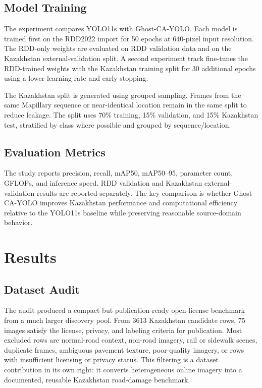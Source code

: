 \documentclass[applsci,article,submit,moreauthors]{Definitions/mdpi}
\begin{document}
\subsection{Model Training}

The experiment compares YOLO11s with Ghost-CA-YOLO. Each model is trained first on the RDD2022 import for 50 epochs at 640-pixel input resolution. The RDD-only weights are evaluated on RDD validation data and on the Kazakhstan external-validation split. A second experiment track fine-tunes the RDD-trained weights with the Kazakhstan training split for 30 additional epochs using a lower learning rate and early stopping.

The Kazakhstan split is generated using grouped sampling. Frames from the same Mapillary sequence or near-identical location remain in the same split to reduce leakage. The split uses 70\% training, 15\% validation, and 15\% Kazakhstan test, stratified by class where possible and grouped by sequence/location.

\subsection{Evaluation Metrics}

The study reports precision, recall, mAP50, mAP50--95, parameter count, GFLOPs, and inference speed. RDD validation and Kazakhstan external-validation results are reported separately. The key comparison is whether Ghost-CA-YOLO improves Kazakhstan performance and computational efficiency relative to the YOLO11s baseline while preserving reasonable source-domain behavior.

\section{Results}

\subsection{Dataset Audit}

The audit produced a compact but publication-ready open-license benchmark from a much larger discovery pool. From 3613 Kazakhstan candidate rows, 75 images satisfy the license, privacy, and labeling criteria for publication. Most excluded rows are normal-road context, non-road imagery, rail or sidewalk scenes, duplicate frames, ambiguous pavement texture, poor-quality imagery, or rows with insufficient licensing or privacy status. This filtering is a dataset contribution in its own right: it converts heterogeneous online imagery into a documented, reusable Kazakhstan road-damage benchmark.
\end{document}
